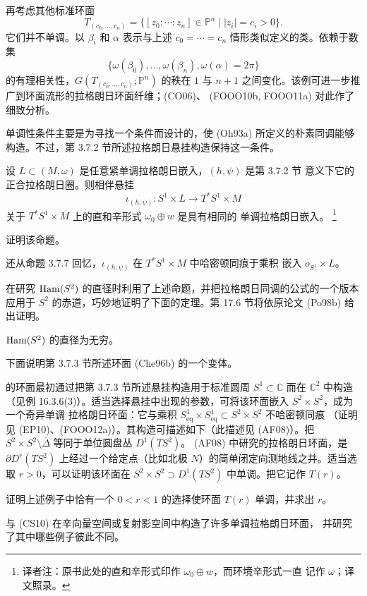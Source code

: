 再考虑其他标准环面
\[
 T_{(c_0,\ldots,c_n)}
 =\{[z_0:\cdots:z_n]\in\mathbb P^n\mid |z_i|=c_i>0\}.
\]
它们并不单调。以 $\beta_i$ 和 $\alpha$ 表示与上述
$c_0=\cdots=c_n$ 情形类似定义的类。依赖于数集
\[
 \{\omega(\beta_0),\ldots,\omega(\beta_n),\omega(\alpha)=2\pi\}
\]
的有理相关性，$G(T_{(c_0,\ldots,c_n)};\mathbb P^n)$ 的秩在 $1$ 与 $n+1$
之间变化。该例可进一步推广到环面流形的拉格朗日环面纤维；(CO06)、
(FOOO10b, FOOO11a) 对此作了细致分析。

单调性条件主要是为寻找一个条件而设计的，使 (Oh93a) 所定义的朴素\personFloer{}同调能够
构造。不过，第 3.7.2 节所述拉格朗日悬挂构造保持这一条件。

\begin{proposition}
\label{prop:monotone-suspension}
设 $L\subset(M,\omega)$ 是任意紧单调拉格朗日嵌入，$(h,\psi)$ 是第 3.7.2 节
意义下它的正合拉格朗日圈。则相伴悬挂
\[
 \iota_{(h,\psi)}:S^1\times L\longrightarrow T^*S^1\times M
\]
关于 $T^*S^1\times M$ 上的直和辛形式 $\omega_0\oplus w$ 是具有相同\termMonotonicityConstant{}的
单调拉格朗日嵌入。
\footnote{译者注：原书此处的直和辛形式印作 $\omega_0\oplus w$，而环境辛形式一直
记作 $\omega$；译文照录。}
\end{proposition}

\begin{exercise}
\label{ex:prove-monotone-suspension}
证明该命题。
\end{exercise}

还从命题 3.7.7 回忆，$\iota_{(h,\psi)}$ 在 $T^*S^1\times M$ 中哈密顿同痕于乘积
嵌入 $o_{S^1}\times L$。

\personPolterovich{}在研究 $\operatorname{Ham}(S^2)$ 的\personHofer{}直径时利用了上述命题，并把拉格朗日\personFloer{}同调的\personKunneth{}公式的一个版本应用于 $S^2$ 的赤道，巧妙地证明了下面的定理。第
17.6 节将依原论文 (Po98b) 给出证明。

\begin{theorem}[\personPolterovich{}]
\label{thm:hofer-diameter-s2-infinite}
$\operatorname{Ham}(S^2)$ 的\personHofer{}直径为无穷。
\end{theorem}

下面说明第 3.7.3 节所述\personChekanov{}环面 (Che96b) 的一个变体。

\begin{example}
\label{ex:chekanov-torus-s2xs2}
\personChekanov{}的环面最初通过把第 3.7.3 节所述悬挂构造用于标准圆周
$S^1\subset\mathbb C$ 而在 $\mathbb C^2$ 中构造（见例 16.3.6(3)）。适当选择\personChekanov{}悬挂中出现的参数，可将该环面嵌入 $S^2\times S^2$，成为一个奇异单调
拉格朗日环面：它与乘积
$S^1_{\mathrm{eq}}\times S^1_{\mathrm{eq}}\subset S^2\times S^2$ 不哈密顿同痕
（证明见 (EP10)、(FOOO12a)）。其构造可描述如下（此描述见 (AF08)）。把
$S^2\times S^2\setminus\overline\Delta$ 等同于单位圆盘丛 $D^1(TS^2)$。
(AF08) 中研究的拉格朗日环面，是 $\partial D^r(TS^2)$ 上经过一个给定点（比如北极
$N$）的简单闭定向测地线之并。适当选取 $r>0$，可以证明该环面在
$S^2\times S^2\supset D^1(TS^2)$ 中单调。把它记作 $T(r)$。
\end{example}

\begin{exercise}
\label{ex:unique-monotone-chekanov-radius}
证明上述例子中恰有一个 $0<r<1$ 的选择使环面 $T(r)$ 单调，并求出 $r$。
\end{exercise}

\personChekanov{}与\personSchlenk{} (CS10) 在辛向量空间或复射影空间中构造了许多单调拉格朗日环面，
并研究了其中哪些例子彼此不同。
